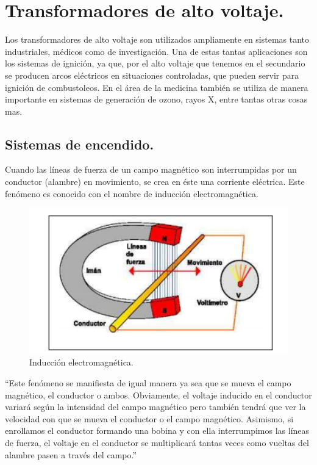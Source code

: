 \section{Transformadores de alto voltaje.}

Los transformadores de alto voltaje son utilizados ampliamente en sistemas tanto industriales, médicos como de investigación. Una de estas tantas aplicaciones son los sistemas de ignición, ya que, por el alto voltaje que tenemos en el secundario se producen arcos eléctricos en situaciones controladas, que pueden servir para ignición de combustoleos. En el área de la medicina también se utiliza de manera importante en sistemas de generación de ozono, rayos X, entre tantas otras cosas mas.  \\

\subsection{Sistemas de encendido.}

Cuando las líneas de fuerza de un campo magnético son
interrumpidas por un conductor (alambre) en movimiento, se crea en éste
una corriente eléctrica. Este fenómeno es conocido con el nombre de
inducción electromagnética.\\

\begin{figure}[H]
\centering
\includegraphics[width=12cm]{capitulo3/figs/induc.png}
\caption{ Inducción electromagnética.}
\end{figure}

``Este fenómeno se manifiesta de igual manera ya sea que se
mueva el campo magnético, el conductor o ambos. Obviamente, el voltaje
inducido en el conductor variará según la intensidad del campo magnético
pero también tendrá que ver la velocidad con que se mueva el conductor o el campo magnético. Asimismo, si enrollamos el conductor formando una
bobina y con ella interrumpimos las líneas de fuerza, el voltaje en el
conductor se multiplicará tantas veces como vueltas del alambre pasen a
través del campo.''\\

